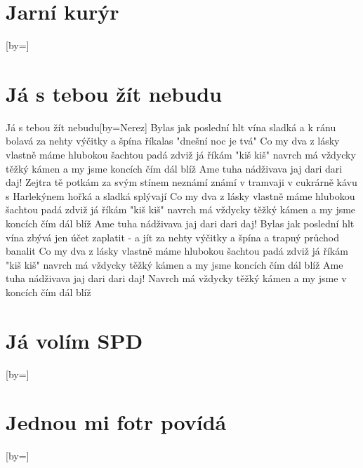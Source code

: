 \documentclass{article}
\begin{document}
\begin{songs}{}
\section{Jarní kurýr}
\begin{song}{}[by={}]
\beginverse

\endverse
\end{song}

\section{Já s tebou žít nebudu}
\begin{song}{Já s tebou žít nebudu}[by={Nerez}]
\beginverse
Bylas jak poslední hlt vína
sladká a k ránu bolavá
za nehty výčitky a špína
říkalas "dnešní noc je tvá"
\endverse
\beginverse
Co my dva z lásky vlastně máme
hlubokou šachtou padá zdviž
já říkám "kiš kiš"
navrch má vždycky těžký kámen
a my jsme koncích čím dál blíž
\endverse
\beginverse
Ame tuha nádživava jaj dari dari daj!
\endverse
\beginverse
Zejtra tě potkám za svým stínem
neznámí známí v tramvaji
v cukrárně kávu s Harlekýnem
hořká a sladká splývají
\endverse
\beginverse
Co my dva z lásky vlastně máme
hlubokou šachtou padá zdviž
já říkám "kiš kiš"
navrch má vždycky těžký kámen
a my jsme koncích čím dál blíž
\endverse
\beginverse
Ame tuha nádživava jaj dari dari daj!
\endverse
\beginverse
Bylas jak poslední hlt vína
zbývá jen účet zaplatit - a jít
za nehty výčitky a špína
a trapný průchod banalit
Co my dva z lásky vlastně máme
hlubokou šachtou padá zdviž
já říkám "kiš kiš"
navrch má vždycky těžký kámen
a my jsme koncích čím dál blíž
\endverse
\beginverse
Ame tuha nádživava jaj dari dari daj!
\endverse
\beginverse
Navrch má vždycky těžký kámen
a my jsme v koncích čím dál blíž 
\endverse
\end{song}

\section{Já volím SPD}
\begin{song}{}[by={}]
\beginverse

\endverse
\end{song}

\section{Jednou mi fotr povídá}
\begin{song}{}[by={}]
\beginverse

\endverse
\end{song}


\end{songs}
\end{document}
